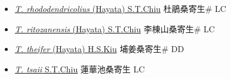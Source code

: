 \begin{itemize}
\begin{itemize}
        \item[] \href{http://www.theplantlist.org/tpl1.1/search?q=Taxillus+rhododendricolius}{\textit{T. rhododendricolius} (Hayata) S.T.Chiu}   杜鵑桑寄生\# LC
        \item[] \href{http://www.theplantlist.org/tpl1.1/search?q=Taxillus+ritozanensis}{\textit{T. ritozanensis} (Hayata) S.T.Chiu}   李棟山桑寄生\# LC
        \item[] \href{http://www.theplantlist.org/tpl1.1/search?q=Taxillus+theifer}{\textit{T. theifer} (Hayata) H.S.Kiu}   埔姜桑寄生\# DD
        \item[] \href{http://www.theplantlist.org/tpl1.1/search?q=Taxillus+tsaii}{\textit{T. tsaii} S.T.Chiu}   蓮華池桑寄生 LC
  \end{itemize}
  \end{itemize}

